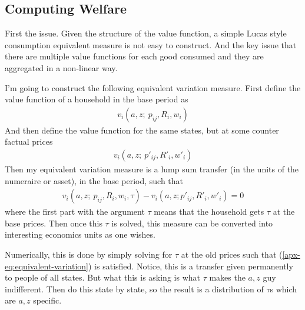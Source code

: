 \documentclass[12pt,pdftex]{article}
\begin{document}
\begin{onehalfspacing}
{}




\newpage

\section{Computing Welfare}

First the issue. Given the structure of the value function, a simple Lucas style consumption equivalent measure is not easy to construct. And the key issue that there are multiple value functions for each good consumed and they are aggregated in a non-linear way. 

I'm going to construct the following equivalent variation measure. First define the value function of a household in the base period as
\begin{align}
v_i(a, z ; \ p_{ij}, R_{i}, w_{i})
\end{align}
And then define the value function for the same states, but at some counter factual prices
\begin{align} 
v_i(a, z ; \ p'_{ij}, R'_{i}, w'_{i})
\end{align}
Then my equivalent variation measure is a lump sum transfer (in the units of the numeraire or asset), in the base period, such that
\begin{align}
v_i(a, z ; \ p_{ij}, R_{i}, w_{i}, \tau) - v_i(a, z ; p'_{ij}, R'_{i}, w'_{i}) = 0
\label{apx-eq:equivalent-variation}
\end{align}
where the first part with the argument $\tau$ means that the household gets $\tau$ at the base prices. Then once this $\tau$ is solved, this measure can be converted into interesting economics units as one wishes.

Numerically, this is done by simply solving for $\tau$ at the old prices such that (\ref{apx-eq:equivalent-variation}) is satisfied. Notice, this is a transfer given permanently to people of all states. But what this is asking is what $\tau$ makes the $a,z$ guy indifferent. Then do this state by state, so the result is a distribution of $\tau$s which are $a,z$ specific.


\end{onehalfspacing}
\end{document}

